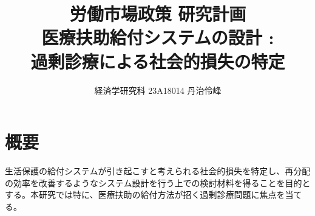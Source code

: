 \documentclass{jsarticle}[12pt]
\begin{document}
\title{労働市場政策 研究計画 \\
医療扶助給付システムの設計 : \\ 過剰診療による社会的損失の特定}
\author{経済学研究科 23A18014 丹治伶峰}
\date{}
\maketitle

\large

\section{概要}
\hspace{1zw}生活保護の給付システムが引き起こすと考えられる社会的損失を特定し、再分配の効率を改善するようなシステム設計を行う上での検討材料を得ることを目的とする。本研究では特に、医療扶助の給付方法が招く過剰診療問題に焦点を当てる。
\end{document}
